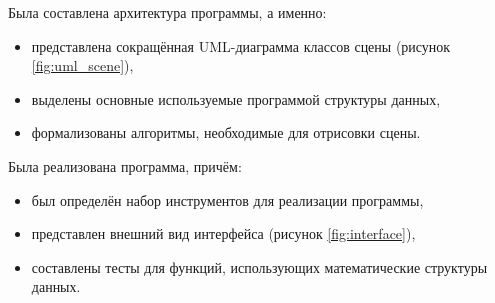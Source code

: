 Была составлена архитектура программы, а именно:
\begin{itemize}
	\item представлена сокращённая UML-диаграмма классов сцены (рисунок \ref{fig:uml_scene}),
	\item выделены основные используемые программой структуры данных,
	\item формализованы алгоритмы, необходимые для отрисовки сцены.
\end{itemize}

Была реализована программа, причём:
\begin{itemize}
	\item был определён набор инструментов для реализации программы,
	\item представлен внешний вид интерфейса (рисунок \ref{fig:interface}),
	\item составлены тесты для функций, использующих математические структуры данных.
\end{itemize}





